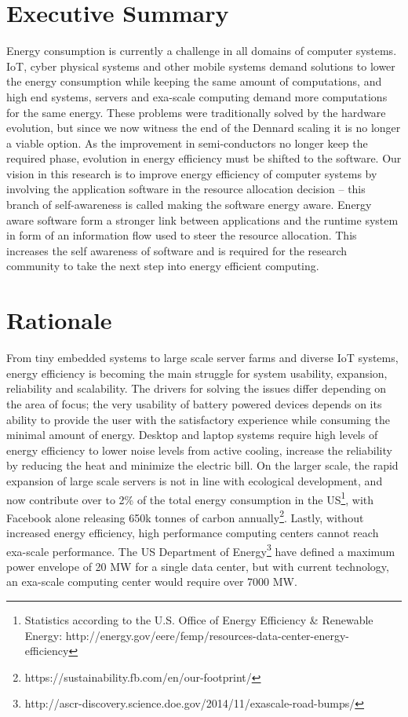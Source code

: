 \documentclass{article}
\begin{document}
\section{Executive Summary}
Energy consumption is currently a challenge in all domains of computer systems.
IoT, cyber physical systems and other mobile systems demand solutions to lower the energy consumption while keeping the same amount of computations,
and high end systems, servers and exa-scale computing demand more computations for the same energy.
These problems were traditionally solved by the hardware evolution, but since we now witness the end of the Dennard scaling \cite{Dennard:74} it is no longer a viable option.
As the improvement in semi-conductors no longer keep the required phase, evolution in energy efficiency must be shifted to the software.
Our vision in this research is to improve energy efficiency of computer systems by involving the application software in the resource allocation decision -- this branch of self-awareness is called making the software energy aware.
Energy aware software form a stronger link between applications and the runtime system in form of an information flow used to steer the resource allocation.
This increases the self awareness of software and is required for the research community to take the next step into energy efficient computing.

\section{Rationale}
From tiny embedded systems to large scale server farms and diverse IoT systems, energy efficiency is becoming the main struggle for system usability, expansion, reliability and scalability.
The drivers for solving the issues differ depending on the area of focus;
the very usability of battery powered devices depends on its ability to provide the user with the satisfactory experience while consuming the minimal amount of energy.
Desktop and laptop systems require high levels of energy efficiency to lower noise levels from active cooling, increase the reliability by reducing the heat and minimize the electric bill.
On the larger scale, the rapid expansion of large scale servers is not in line with ecological development, and now contribute over to 2\% of the total energy consumption in the US\footnote{Statistics according to the U.S. Office of Energy Efficiency \& Renewable Energy: http://energy.gov/eere/femp/resources-data-center-energy-efficiency}, with Facebook alone releasing 650k tonnes of carbon annually\footnote{https://sustainability.fb.com/en/our-footprint/}.
Lastly, without increased energy efficiency, high performance computing centers cannot reach exa-scale performance.
The US Department of Energy\footnote{http://ascr-discovery.science.doe.gov/2014/11/exascale-road-bumps/} have defined a maximum power envelope of 20 MW for a single data center, but with current technology, an exa-scale computing center would require over 7000 MW.\smallskip
\end{document}
